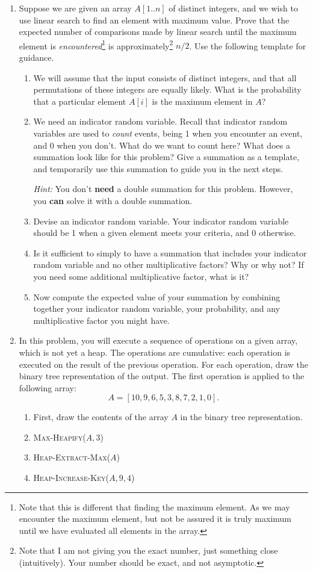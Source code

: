 \documentclass[letterpaper,11pt]{article}
\begin{document}
\begin{enumerate}
\item Suppose we are given an array $A[1..n]$ of distinct integers, and we wish to use linear search to find an element with maximum value. Prove that the expected number of comparisons made by linear search until the maximum element is \emph{encountered}\footnote{Note that this is different that finding the maximum element. As we may encounter the maximum element, but not be assured it is truly maximum until we have evaluated all elements in the array.} is approximately\footnote{Note that I am not giving you the exact number, just something close (intuitively). Your number should be exact, and not asymptotic.} $n/2$. Use the following template for guidance.
\begin{enumerate}
\item We will assume that the input consists of distinct integers, and that all permutations of these integers are equally likely. What is the probability that a particular element $A[i]$ is the maximum element in $A$?
\item We need an indicator random variable. Recall that indicator random variables are used to \emph{count} events, being 1 when you encounter an event, and 0 when you don't. What do we want to count here? What does a summation look like for this problem? Give a summation as a template, and temporarily use this summation to guide you in the next steps.

\emph{Hint:} You don't \textbf{need} a double summation for this problem. However, you \textbf{can} solve it with a double summation.
\item Devise an indicator random variable. Your indicator random variable should be 1 when a given element meets your criteria, and 0 otherwise. 
\item Is it sufficient to simply to have a summation that includes your indicator random variable and no other multiplicative factors? Why or why not? If you need some additional multiplicative factor, what is it?
\item Now compute the expected value of your summation by combining together your indicator random variable, your probability, and any multiplicative factor you might have.
\end{enumerate}

\newpage
\item In this problem, you will execute a sequence of operations on a given array, which is not yet a heap. The operations are cumulative: each operation is executed on the result of the previous operation. For each operation, draw the binary tree representation of the output. The first operation is applied to the following array:
\[A = [10,9,6,5,3,8,7,2,1,0].\]
\begin{enumerate}
    \item First, draw the contents of the array $A$ in the binary tree representation.
    \item \textsc{Max-Heapify}($A,3$)
    \item \textsc{Heap-Extract-Max}($A$)
    \item \textsc{Heap-Increase-Key}($A,9,4$)
\end{enumerate}


\end{enumerate}
\end{document}
